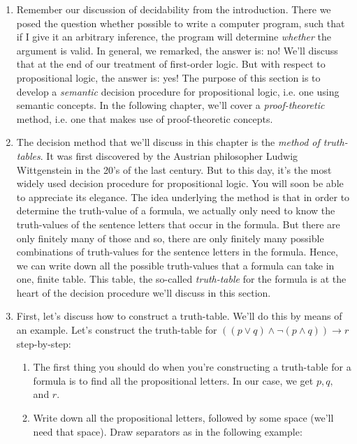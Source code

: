 	\begin{enumerate}[\thesection.1]

		\item Remember our discussion of decidability from the introduction. There we posed the question whether possible to write a computer program, such that if I give it an arbitrary inference, the program will determine \emph{whether} the argument is valid. In general, we remarked, the answer is: no! We'll discuss that at the end of our treatment of first-order logic. But with respect to propositional logic, the answer is: yes! The purpose of this section is to develop a \emph{semantic} decision procedure for propositional logic, i.e. one using semantic concepts. In the following chapter, we'll cover a \emph{proof-theoretic} method, i.e. one that makes use of proof-theoretic concepts.
		
		\item The decision method that we'll discuss in this chapter is the \emph{method of truth-tables}. It was first discovered by the Austrian philosopher Ludwig Wittgenstein in the 20's of the last century. But to this day, it's the most widely used decision procedure for propositional logic. You will soon be able to appreciate its elegance. The idea underlying the method is that in order to determine the truth-value of a formula, we actually only need to know the truth-values of the sentence letters that occur in the formula. But there are only finitely many of those and so, there are only finitely many possible combinations of truth-values for the sentence letters in the formula. Hence, we can write down all the possible truth-values that a formula can take in one, finite table. This table, the so-called \emph{truth-table} for the formula is at the heart of the decision procedure we'll discuss in this section.
	
	\item First, let's discuss how to construct a truth-table. We'll do this by means of an example. Let's construct the truth-table for $((p\lor q)\land \neg (p\land q)) \to r$  step-by-step:

\begin{enumerate}

\item The first thing you should do when you're constructing a truth-table for a formula is to find all the propositional letters. In our case, we get $p,q,$ and $r$.

\item Write down all the propositional letters, followed by some space (we'll need that space). Draw separators as in the following example:


\end{enumerate}
\end{enumerate}
